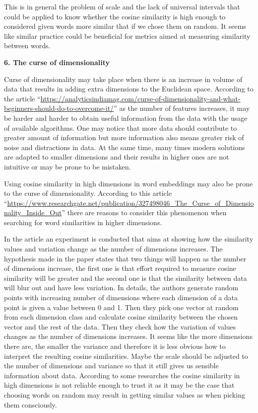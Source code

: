 \documentclass[
  12pt,
]{book}
\begin{document}
This is in general the problem of scale and the lack of universal intervals that could be applied to know whether the cosine similarity is high enough to considered given words more similar that if we chose them on random. It seems like similar practice could be beneficial for metrics aimed at measuring similarity between words.

\textbf{6. The curse of dimensionality}

Curse of dimensionality may take place when there is an increase in volume of data that results in adding extra dimensions to the Euclidean space. According to the article
``\url{https://analyticsindiamag.com/curse-of-dimensionality-and-what-beginners-should-do-to-overcome-it/}''
as the number of features increases, it may be harder and harder to obtain useful information from the data with the usage of available algorithms. One may notice that more data should contribute to greater amount of information but more information also means greater risk of noise and distractions in data. At the same time, many times modern solutions are adapted to smaller dimensions and their results in higher ones are not intuitive or may be prone to be mistaken.

Using cosine similarity in high dimensions in word embeddings may also be prone to the curse of dimensionality. According to this article ``\url{https://www.researchgate.net/publication/327498046_The_Curse_of_Dimensionality_Inside_Out}''
there are reasons to consider this phenomenon when searching for word similarities in higher dimensions.

In the article an experiment is conducted that aims at showing how the similarity values and variation change as the number of dimensions increases. The hypothesis made in the paper states that two things will happen as the number of dimensions increase, the first one is that effort required to measure cosine similarity will be greater and the second one is that the similarity between data will blur out and have less variation. In details, the authors generate random points with increasing number of dimensions where each dimension of a data point is given a value between 0 and 1. Then they pick one vector at random from each dimension class and calculate cosine similarity between the chosen vector and the rest of the data. Then they check how the variation of values changes as the number of dimensions increases. It seems like the more dimensions there are, the smaller the variance and therefore it is less obvious how to interpret the resulting cosine similarities. Maybe the scale should be adjusted to the number of dimensions and variance so that it still gives us sensible information about data. According to some researches the cosine similarity in high dimensions is not reliable enough to trust it as it may be the case that choosing words on random may result in getting similar values as when picking them consciously.
\end{document}
